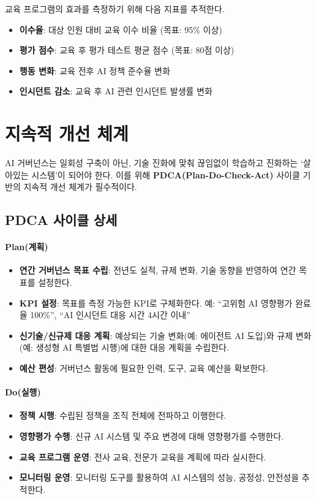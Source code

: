 교육 프로그램의 효과를 측정하기 위해 다음 지표를 추적한다.
\begin{itemize}
 \item \textbf{이수율}: 대상 인원 대비 교육 이수 비율 (목표: 95\% 이상)
 \item \textbf{평가 점수}: 교육 후 평가 테스트 평균 점수 (목표: 80점 이상)
 \item \textbf{행동 변화}: 교육 전후 AI 정책 준수율 변화
 \item \textbf{인시던트 감소}: 교육 후 AI 관련 인시던트 발생률 변화
\end{itemize}

\section{지속적 개선 체계}
\label{sec:20.4}

AI 거버넌스는 일회성 구축이 아닌, 기술 진화에 맞춰 끊임없이 학습하고 진화하는 `살아있는 시스템'이 되어야 한다. 이를 위해 \textbf{PDCA\cite{iso42001}(Plan-Do-Check-Act)} 사이클 기반의 지속적 개선 체계가 필수적이다.

\subsection{PDCA 사이클 상세}

\paragraph{Plan(계획)}
\begin{itemize}
 \item \textbf{연간 거버넌스 목표 수립}: 전년도 실적, 규제 변화, 기술 동향을 반영하여 연간 목표를 설정한다.
 \item \textbf{KPI 설정}: 목표를 측정 가능한 KPI로 구체화한다. 예: ``고위험 AI 영향평가 완료율 100\%'', ``AI 인시던트 대응 시간 4시간 이내''
 \item \textbf{신기술/신규제 대응 계획}: 예상되는 기술 변화(예: 에이전트 AI 도입)와 규제 변화(예: 생성형 AI 특별법 시행)에 대한 대응 계획을 수립한다.
 \item \textbf{예산 편성}: 거버넌스 활동에 필요한 인력, 도구, 교육 예산을 확보한다.
\end{itemize}

\paragraph{Do(실행)}
\begin{itemize}
 \item \textbf{정책 시행}: 수립된 정책을 조직 전체에 전파하고 이행한다.
 \item \textbf{영향평가 수행}: 신규 AI 시스템 및 주요 변경에 대해 영향평가를 수행한다.
 \item \textbf{교육 프로그램 운영}: 전사 교육, 전문가 교육을 계획에 따라 실시한다.
 \item \textbf{모니터링 운영}: 모니터링 도구를 활용하여 AI 시스템의 성능, 공정성, 안전성을 추적한다.
\end{itemize}

